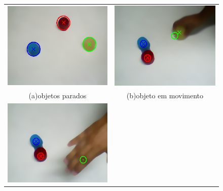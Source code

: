 \documentclass[journal]{IEEEtran}
\begin{document}
\begin{figure}[!htp]
  \centering
  \begin{tabular}{cc}
	\includegraphics[scale = 0.5]{../images/outputCircle.jpg}& 
	\includegraphics[scale = 0.5]{../images/outoutOnMove.jpg} \\
	{\scriptsize(a)objetos parados} & {\scriptsize(b)objeto em 
movimento} \\
	\includegraphics[scale = 
	      0.5]{../images/outputOnHidden.jpg}&
	\includegraphics[scale = 

\end{tabular}
\end{figure}
\end{document}
